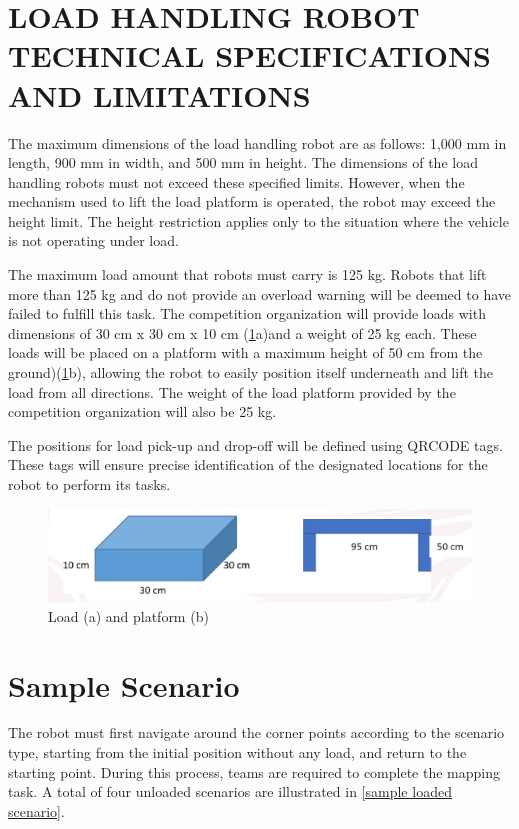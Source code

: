 \documentclass[../../main]{subfiles}
\begin{document}
\section[Load Handling Robot Specs \& Limits]{LOAD HANDLING ROBOT TECHNICAL SPECIFICATIONS AND LIMITATIONS}

The maximum dimensions of the load handling robot are as follows: 1,000 mm in length, 900 mm in width, and 500 mm in height. The dimensions of the load handling robots must not exceed these specified limits. However, when the mechanism used to lift the load platform is operated, the robot may exceed the height limit. The height restriction applies only to the situation where the vehicle is not operating under load.

The maximum load amount that robots must carry is 125 kg. Robots that lift more than 125 kg and do not provide an overload warning will be deemed to have failed to fulfill this task. The competition organization will provide loads with dimensions of 30 cm x 30 cm x 10 cm (\cref{fig:tekno}a)and a weight of 25 kg each. These loads will be placed on a platform with a maximum height of 50 cm from the ground)(\cref{fig:tekno}b), allowing the robot to easily position itself underneath and lift the load from all directions. The weight of the load platform provided by the competition organization will also be 25 kg.

The positions for load pick-up and drop-off will be defined using QRCODE tags. These tags will ensure precise identification of the designated locations for the robot to perform its tasks.
\begin{figure}[h!]
    \centering
    \includegraphics[width=\textwidth]{img/load.png}
    \caption{Load (a) and platform (b)}
    \label{fig:tekno}
\end{figure}

\section{Sample Scenario}

The robot must first navigate around the corner points according to the scenario type, starting from the initial position without any load, and return to the starting point. During this process, teams are required to complete the mapping task. A total of four unloaded scenarios are illustrated in \cref{sample loaded scenario}.
\end{document}
